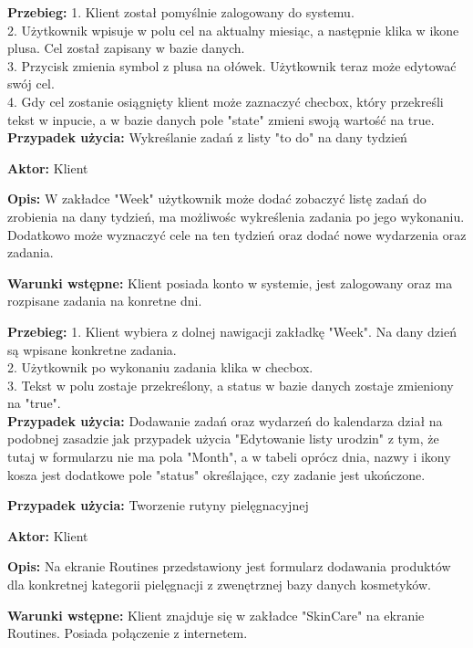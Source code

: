\textbf{Przebieg:} 1. Klient został pomyślnie zalogowany do systemu.\\
2. Użytkownik wpisuje w polu cel na aktualny miesiąc, a następnie klika w ikone plusa. Cel został zapisany w bazie danych.\\
3. Przycisk zmienia symbol z plusa na ołówek. Użytkownik teraz może edytować swój cel.\\
4. Gdy cel zostanie osiągnięty klient może zaznaczyć checbox, który przekreśli tekst w inpucie, a w bazie danych pole "state" zmieni swoją wartość na true.\\ 



\textbf{Przypadek użycia:} Wykreślanie zadań z listy "to do" na dany tydzień 

\textbf{Aktor:} Klient

\textbf{Opis:} W zakładce "Week" użytkownik może dodać zobaczyć listę zadań do zrobienia na dany tydzień, ma możliwośc wykreślenia zadania po jego wykonaniu. Dodatkowo może wyznaczyć cele na ten tydzień oraz dodać nowe wydarzenia oraz zadania. 

\textbf{Warunki wstępne:} Klient posiada konto w systemie, jest zalogowany oraz ma rozpisane zadania na konretne dni.

\textbf{Przebieg:} 
1. Klient wybiera z dolnej nawigacji zakładkę "Week". Na dany dzień są wpisane konkretne zadania.\\
2. Użytkownik po wykonaniu zadania klika w checbox. \\
3. Tekst w polu zostaje przekreślony, a status w bazie danych zostaje zmieniony na "true".\\


\textbf{Przypadek użycia:} Dodawanie zadań oraz wydarzeń do kalendarza dział na podobnej zasadzie jak przypadek użycia "Edytowanie listy urodzin" z tym, że tutaj w formularzu nie ma pola "Month", a w tabeli oprócz dnia, nazwy i ikony kosza jest dodatkowe pole "status" określające, czy zadanie jest ukończone.

\textbf{Przypadek użycia:} Tworzenie rutyny pielęgnacyjnej 

\textbf{Aktor:} Klient

\textbf{Opis:} Na ekranie Routines przedstawiony jest formularz dodawania produktów dla konkretnej kategorii pielęgnacji z zwenętrznej bazy danych kosmetyków.

\textbf{Warunki wstępne:} Klient znajduje się w zakładce "SkinCare" na ekranie Routines. Posiada połączenie z internetem. 

